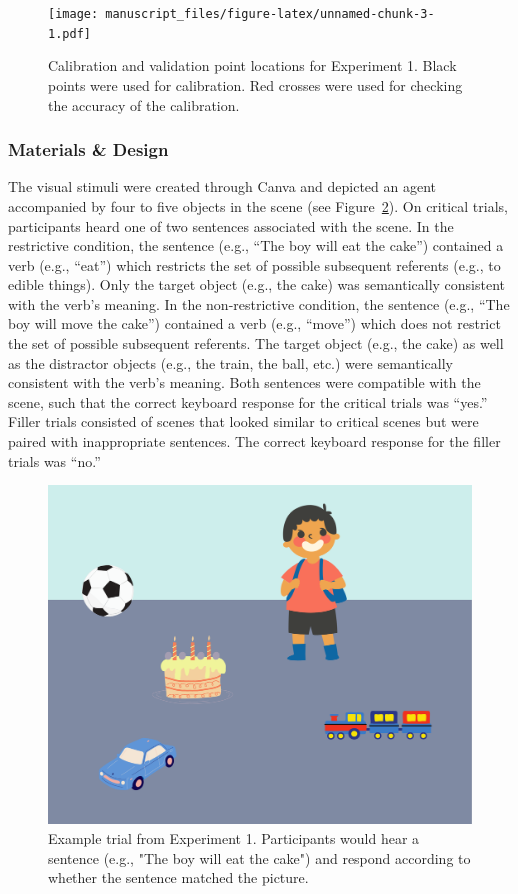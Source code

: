 \documentclass[
  man,floatsintext]{apa6}
\begin{document}
\begin{figure}
\centering
\texttt{[image: manuscript\_files/figure-latex/unnamed-chunk-3-1.pdf]}
\caption{\label{fig:unnamed-chunk-3}Calibration and validation point locations for Experiment 1. Black points were used for calibration. Red crosses were used for checking the accuracy of the calibration.}
\end{figure}

\hypertarget{materials-design}{%
\subsubsection{Materials \& Design}\label{materials-design}}

The visual stimuli were created through Canva and depicted an agent
accompanied by four to five objects in the scene (see Figure~\ref{fig:E1-example-trial}). On
critical trials, participants heard one of two sentences associated with
the scene. In the restrictive condition, the sentence (e.g., ``The boy
will eat the cake'') contained a verb (e.g., ``eat'') which restricts the
set of possible subsequent referents (e.g., to edible things). Only the
target object (e.g., the cake) was semantically consistent with the
verb's meaning. In the non-restrictive condition, the sentence (e.g.,
``The boy will move the cake'') contained a verb (e.g., ``move'') which does
not restrict the set of possible subsequent referents. The target object
(e.g., the cake) as well as the distractor objects (e.g., the train, the
ball, etc.) were semantically consistent with the verb's meaning. Both
sentences were compatible with the scene, such that the correct keyboard
response for the critical trials was ``yes.'' Filler trials consisted of
scenes that looked similar to critical scenes but were paired with
inappropriate sentences. The correct keyboard response for the filler
trials was ``no.''

\begin{figure}
\includegraphics[width=6.67in]{group-a/E1-example-trial} \caption{Example trial from Experiment 1. Participants would hear a sentence (e.g., "The boy will eat the cake") and respond according to whether the sentence matched the picture.}\label{fig:E1-example-trial}
\end{figure}
\end{document}
